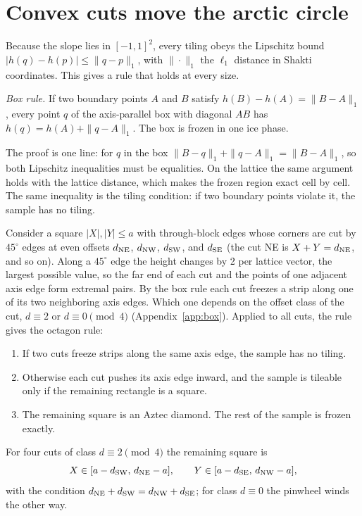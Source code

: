\documentclass[reprint,aps,prb,floatfix,longbibliography,amsmath,amssymb]{revtex4-2}
\begin{document}
\section{Convex cuts move the arctic circle}\label{sec:convex}

Because the slope lies in $[-1,1]^2$, every tiling obeys the Lipschitz bound $|h(q)-h(p)|\le\|q-p\|_1$, with $\|\cdot\|_1$ the $\ell_1$ distance in Shakti coordinates. This gives a rule that holds at every size.

\emph{Box rule.} If two boundary points $A$ and $B$ satisfy $h(B)-h(A)=\|B-A\|_1$, every point $q$ of the axis-parallel box with diagonal $AB$ has $h(q)=h(A)+\|q-A\|_1$. The box is frozen in one ice phase.

The proof is one line: for $q$ in the box $\|B-q\|_1+\|q-A\|_1=\|B-A\|_1$, so both Lipschitz inequalities must be equalities. On the lattice the same argument holds with the lattice distance, which makes the frozen region exact cell by cell. The same inequality is the tiling condition: if two boundary points violate it, the sample has no tiling.

Consider a square $|X|,|Y|\le a$ with through-block edges whose corners are cut by $45^\circ$ edges at even offsets $d_{\rm NE}$, $d_{\rm NW}$, $d_{\rm SW}$, and $d_{\rm SE}$ (the cut NE is $X+Y=d_{\rm NE}$, and so on). Along a $45^\circ$ edge the height changes by 2 per lattice vector, the largest possible value, so the far end of each cut and the points of one adjacent axis edge form extremal pairs. By the box rule each cut freezes a strip along one of its two neighboring axis edges. Which one depends on the offset class of the cut, $d\equiv2$ or $d\equiv0\pmod4$ (Appendix~\ref{app:box}). Applied to all cuts, the rule gives the octagon rule:
\begin{enumerate}
\item If two cuts freeze strips along the same axis edge, the sample has no tiling.
\item Otherwise each cut pushes its axis edge inward, and the sample is tileable only if the remaining rectangle is a square.
\item The remaining square is an Aztec diamond. The rest of the sample is frozen exactly.
\end{enumerate}
For four cuts of class $d\equiv2\pmod4$ the remaining square is
\begin{equation}\label{eq:octagon}
  X\in[a-d_{\rm SW},\,d_{\rm NE}-a],\qquad Y\in[a-d_{\rm SE},\,d_{\rm NW}-a],
\end{equation}
with the condition $d_{\rm NE}+d_{\rm SW}=d_{\rm NW}+d_{\rm SE}$; for class $d\equiv0$ the pinwheel winds the other way.
\end{document}
